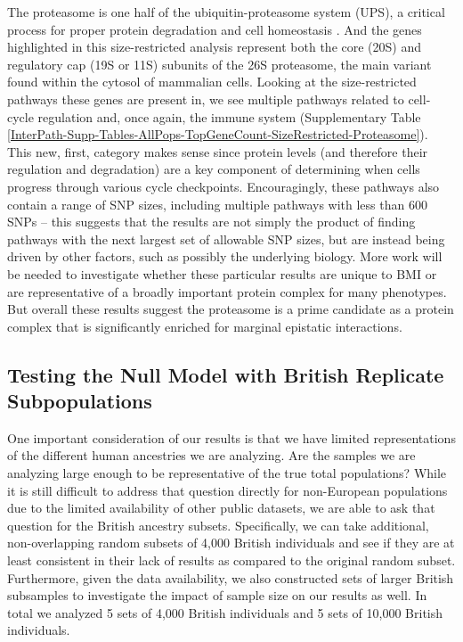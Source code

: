 \documentclass[12pt,a4paper]{article}
\begin{document}
The proteasome is one half of the ubiquitin-proteasome system (UPS), a critical process for proper protein degradation and cell homeostasis \citep{Voges1999,Livneh2016,Collins2017}. And the genes highlighted in this size-restricted analysis represent both the core (20S) and regulatory cap (19S or 11S) subunits of the 26S proteasome, the main variant found within the cytosol of mammalian cells. Looking at the size-restricted pathways these genes are present in, we see multiple pathways related to cell-cycle regulation and, once again, the immune system (Supplementary Table \ref{InterPath-Supp-Tables-AllPops-TopGeneCount-SizeRestricted-Proteasome}). This new, first, category makes sense since protein levels (and therefore their regulation and degradation) are a key component of determining when cells progress through various cycle checkpoints. Encouragingly, these pathways also contain a range of SNP sizes, including multiple pathways with less than 600 SNPs -- this suggests that the results are not simply the product of finding pathways with the next largest set of allowable SNP sizes, but are instead being driven by other factors, such as possibly the underlying biology. More work will be needed to investigate whether these particular results are unique to BMI or are representative of a broadly important protein complex for many phenotypes. But overall these results suggest the proteasome is a prime candidate as a protein complex that is significantly enriched for marginal epistatic interactions.  


\subsection{Testing the Null Model with British Replicate Subpopulations}

One important consideration of our results is that we have limited representations of the different human ancestries we are analyzing. Are the samples we are analyzing large enough to be representative of the true total populations? While it is still difficult to address that question directly for non-European populations due to the limited availability of other public datasets, we are able to ask that question for the British ancestry subsets. Specifically, we can take additional, non-overlapping random subsets of 4,000 British individuals and see if they are at least consistent in their lack of results as compared to the original random subset. Furthermore, given the data availability, we also constructed sets of larger British subsamples to investigate the impact of sample size on our results as well. In total we analyzed 5 sets of 4,000 British individuals and 5 sets of 10,000 British individuals. 
\end{document}

